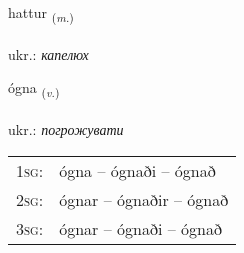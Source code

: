 \documentclass[frontgrid, backgrid]{flacards}\usepackage[]{graphicx}\usepackage[]{xcolor}
\begin{document}
\renewcommand{\flhead}{\vskip5pt \fboxsep=0pt {\small\bfseries\footnotesize Nafnorð | іменник}}
\renewcommand{\fcfoot}{\vskip5pt \fboxsep=0pt \hspace{2pt}{\small\bfseries\footnotesize 3K}}

\renewcommand{\blhead}{\vskip5pt {\small\bfseries\footnotesize Nafnorð | іменник }}
\renewcommand{\bcfoot}{\vskip5pt \hspace{2pt}{\small\bfseries\footnotesize 3K}}


{hattur \small{\textsubscript{(\textit{m.})}} \\[1ex] %
\textphonetic{[hahtʏr]} \\
ukr.: \emph{капелюх} \\  [2ex]
\renewcommand*{\arraystretch}{0.8}
}

\renewcommand{\flhead}{\vskip5pt \fboxsep=0pt {\small\bfseries\footnotesize Sagnorð | дієслово}}
\renewcommand{\fcfoot}{\vskip5pt \fboxsep=0pt \hspace{2pt}{\small\bfseries\footnotesize 3K}}

\renewcommand{\blhead}{\vskip5pt {\small\bfseries\footnotesize Sagnorð | дієслово }}
\renewcommand{\bcfoot}{\vskip5pt \hspace{2pt}{\small\bfseries\footnotesize 3K}}


{ógna \small{\textsubscript{(\textit{v.})}} \\[1ex] %
\textphonetic{[oukna]} \\
ukr.: \emph{погрожувати} \\  [2ex]
\renewcommand*{\arraystretch}{0.8}
\begin{tabular}{p{1cm}l}
\textsc{1sg}: & ógna -- ógnaði -- ógnað \\ 
\textsc{2sg}: & ógnar -- ógnaðir -- ógnað \\ 
\textsc{3sg}: & ógnar -- ógnaði -- ógnað \\ 
\end{tabular}
}
\end{document}
